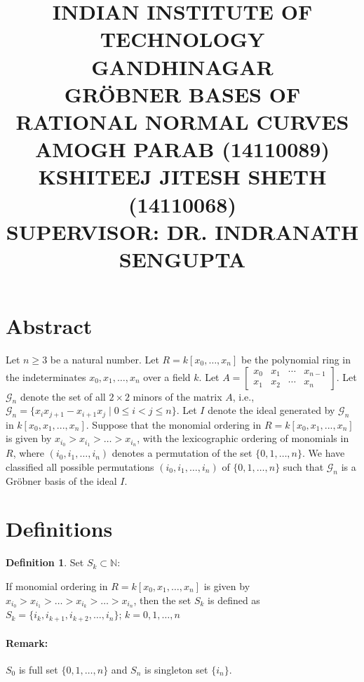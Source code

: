 \documentclass[12pt,a4paper]{article}
\title{
{\bf\Large INDIAN INSTITUTE OF TECHNOLOGY GANDHINAGAR}\\[1in]
{\bf\Large GR\"{O}BNER BASES OF RATIONAL NORMAL CURVES}\\[1in]
{\bf\large AMOGH PARAB (14110089)}\\[2mm]
{\bf\large KSHITEEJ JITESH SHETH (14110068)}\\[1in]
{\bf\large SUPERVISOR: DR. INDRANATH SENGUPTA}\\[2mm]
}
\theoremstyle{definition}
\newtheorem{definition}{Definition}
\begin{document}
\maketitle
\newpage
{}


\section*{Abstract}

\noindent Let $n\geq 3$ be a natural number. Let $R = k[x_{0}, \ldots , x_{n}]$ be the 
polynomial ring in the indeterminates $x_{0}, x_{1} , \ldots , x_{n}$ over a field $k$. Let 
$A = \left[\begin{matrix}
x_{0} & x_{1} & \cdots & x_{n-1}\\
x_{1} & x_{2} & \cdots & x_{n}
\end{matrix}\right]$. 
Let $\mathcal{G}_n$ denote the set of all $2\times 2$ minors of the matrix $A$, i.e., 
$\mathcal{G}_n = \{x_{i}x_{j+1}-x_{i+1}x_{j} \mid 0 \leq i < j \leq n\}$. Let $I$ denote 
the  ideal  generated by $\mathcal{G}_n$ in $k[x_{0}, x_{1},...,x_{n}]$. Suppose that 
the monomial ordering in $R =  k[x_{0}, x_{1},...,x_{n}]$ is given by 
$x_{i_{0}} > x_{i_{1}}> \ldots > x_{i_{n}}$, with the lexicographic ordering of monomials in $R$, 
where $(i_{0}, i_{1}, \ldots , i_{n})$ denotes a permutation of the set $\{0, 1, \ldots , n\}$. 
We have classified all possible permutations $(i_{0}, i_{1}, \ldots , i_{n})$ of $\{0, 1, \ldots , n\}$ 
such that $\mathcal{G}_n$ is a Gr\"{o}bner basis of the ideal $I$.




\section*{Definitions}
\theoremstyle{definition}
\begin{definition}{Set $S_k \subset \mathbb{N}$:}

\noindent If monomial ordering in $R=k[x_0,x_1,\ldots , x_n]$ is given by $x_{i_{0}}> x_{i_{1}}> \ldots> x_{i_{k}}> \ldots> x_{i_{n}}$, then the set $S_k$ is defined as $S_{k}=\{i_{k}, i_{k+1}, i_{k+2}, \ldots, i_{n}\}$; $k=0,1,\ldots ,n$

\end{definition}

\paragraph*{Remark:}
$S_0$ is full set $\{0,1,\ldots, n\}$ and $S_n$ is singleton set $\{i_n\}$.
\end{document}
